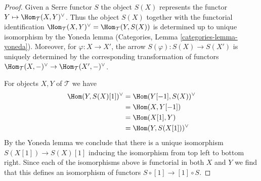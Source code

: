 \begin{proof}

Given a Serre functor $S$ the object $S(X)$ represents
the functor $Y \mapsto \Hom_\mathcal{T}(X, Y)^\vee$.
Thus the object $S(X)$ together with the functorial identification
$\Hom_\mathcal{T}(X, Y)^\vee = \Hom_\mathcal{T}(Y, S(X))$
is determined up to unique isomorphism by the Yoneda lemma
(Categories, Lemma \ref{categories-lemma-yoneda}).
Moreover, for $\varphi : X \to X'$, the arrow $S(\varphi) : S(X) \to S(X')$
is uniquely determined by the corresponding transformation of functors
$\Hom_\mathcal{T}(X, -)^\vee \to \Hom_\mathcal{T}(X', -)^\vee$.

\medskip\noindent
For objects $X, Y$ of $\mathcal{T}$ we have
\begin{align*}
\Hom(Y, S(X)[1])^\vee
& =
\Hom(Y[-1], S(X))^\vee \\
& =
\Hom(X, Y[-1]) \\
& =
\Hom(X[1], Y) \\
& =
\Hom(Y, S(X[1]))^\vee
\end{align*}
By the Yoneda lemma we conclude that there is a unique isomorphism
$S(X[1]) \to S(X)[1]$ inducing the isomorphism from top left to bottom right.
Since each of the isomorphisms above is functorial in both $X$ and $Y$
we find that this defines an isomorphism of functors
$S \circ [1] \to [1] \circ S$.


\end{proof}
